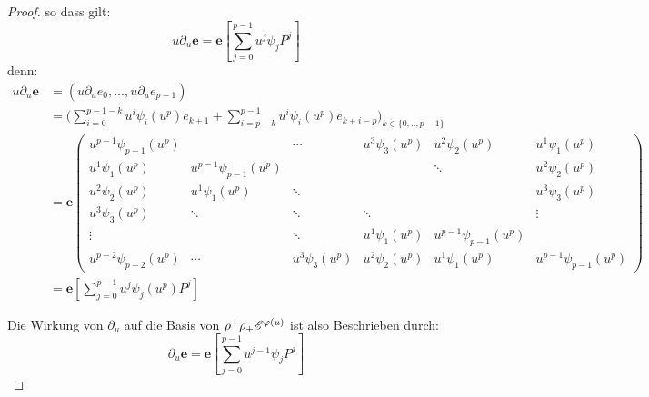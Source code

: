 \begin{proof}
so dass gilt:
\[ u\partial_u\mathbf{e}=\mathbf{e}[\sum_{j=0}^{p-1}u^j\psi_jP^j] \]
denn:\\
\begin{align*}
  u\partial_u\mathbf{e} &= (u\partial_ue_0,...,u\partial_ue_{p-1})\\
  &= \Bigg(\sum_{i=0}^{p-1-k}u^i\psi_i(u^p)e_{k+1} +
    \sum_{i=p-k}^{p-1}u^i\psi_i(u^p)e_{k+i-p}\Bigg)_{k\in\{0,..,p-1\}}\\
  &= \mathbf{e}
  \begin{pmatrix}u^{p-1}\psi_{p-1}(u^p) &  & \cdots & u^{3}\psi_{3}(u^p) & u^{2}
    \psi_{2}(u^p) & u^{1}\psi_{1}(u^p)\\
    u^{1}\psi_{1}(u^p) & u^{p-1}\psi_{p-1}(u^p) &  &  
    & \ddots & u^{2}\psi_{2}(u^p)\\
    u^{2}\psi_{2}(u^p) & u^{1}\psi_{1}(u^p) & \ddots &  &  & u^{3}\psi_{3}(u^p)\\
    u^{3}\psi_{3}(u^p) & \ddots & \ddots & \ddots &  & \vdots\\
    \vdots &  & \ddots & u^{1}\psi_{1}(u^p) & u^{p-1}\psi_{p-1}(u^p)\\
    u^{p-2}\psi_{p-2}(u^p) & \cdots & u^{3}\psi_{3}(u^p) & u^{2}\psi_{2}(u^p) &
    u^{1}\psi_{1}(u^p) & u^{p-1}\psi_{p-1}(u^p)
  \end{pmatrix}\\
  &= \mathbf{e}[\sum_{j=0}^{p-1}u^j\psi_j(u^p)P^j]
\end{align*}


Die Wirkung von $\partial_u$ auf die Basis von $\rho^+\rho_+\mathscr{E}^{\varphi(u)}$ ist
also Beschrieben durch:
\[ \partial_u\mathbf{e}=\mathbf{e}[\sum_{j=0}^{p-1}u^{j-1}\psi_jP^j] \]


\end{proof}
